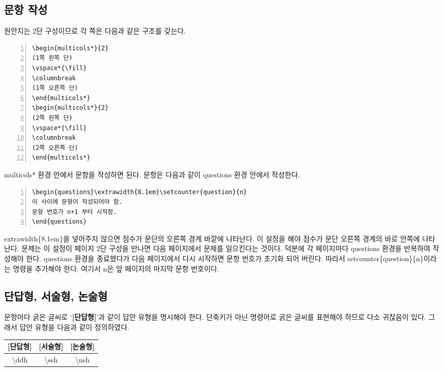 \documentclass[]{gshs_exam_S}
\begin{document}
\begin{multicols*}{2}
\section{문항 작성}

원안지는 2단 구성이므로 각 쪽은 다음과 같은 구조를 갖는다.
\begin{Verbatim}[frame=single,fontsize=\footnotesize,numbers=left,xleftmargin=5mm]
\begin{multicols*}{2}
(1쪽 왼쪽 단)
\vspace*{\fill}
\columnbreak
(1쪽 오른쪽 단)
\end{multicols*}
\begin{multicols*}{2}
(2쪽 왼쪽 단)
\vspace*{\fill}
\columnbreak
(2쪽 오른쪽 단)
\end{multicols*}
\end{Verbatim}
{\ttfamily multicols*} 환경 안에서 문항을 작성하면 된다. 문항은 다음과 같이 {\ttfamily questions} 환경 안에서 작성한다.
\begin{Verbatim}[frame=single,fontsize=\footnotesize,numbers=left,xleftmargin=5mm]
\begin{questions}\extrawidth{8.1em}\setcounter{question}{n}
이 사이에 문항이 작성되어야 함.
문항 번호가 n+1 부터 시작함.
\end{questions}
\end{Verbatim}
{\ttfamily{\textbackslash}extrawidth\{8.1em\}}을 넣어주지 않으면 점수가 문단의 오른쪽 경계 바깥에 나타난다. 이 설정을 해야 점수가 문단 오른쪽 경계의 바로 안쪽에 나타난다. 문제는 이 설정이 페이지 2단 구성을 만나면 다음 페이지에서 문제를 일으킨다는 것이다. 덕분에 각 페이지마다 {\ttfamily questions} 환경을 반복하여 작성해야 한다. {\ttfamily questions} 환경을 종료했다가 다음 페이지에서 다시 시작하면 문항 번호가 초기화 되어 버린다. 따라서 {\ttfamily{\textbackslash}setcounter\{question\}\{n\}}이라는 명령을 추가해야 한다. 여기서 {\ttfamily n}은 앞 페이지의 마지막 문항 번호이다.

\subsection{단답형, 서술형, 논술형}
문항마다 굵은 글씨로 `\textbf{[단답형]}'과 같이 답안 유형을 명시해야 한다.  단축키가 아닌 명령어로 굵은 글씨를 표현해야 하므로 다소 귀찮음이 있다. 그래서 답안 유형을 다음과 같이 정의하였다.
\begin{center}\ttfamily\small
\begin{tabular}{c|c|c}
\hline
{\footnotesize\textbf{[단답형]}}&{\footnotesize\textbf{[서술형]}}&{\footnotesize\textbf{[논술형]}}\\
\hline
{\textbackslash}ddh&{\textbackslash}ssh&{\textbackslash}nsh\\
\hline
\end{tabular}
\end{center}



\end{multicols*}
\end{document}
